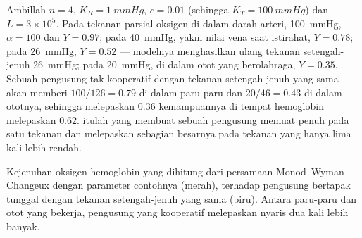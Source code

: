 \begin{example}\label{ex:b3:structural-biology:hb-numbers}
Ambillah $n = 4$, $K_{R} = \qty{1}{mmHg}$, $c = 0.01$ (sehingga $K_{T} =
\qty{100}{mmHg}$) dan $L = 3\times 10^{5}$. Pada tekanan parsial
oksigen di dalam darah arteri, \qty{100}{mmHg}, $\alpha = 100$ dan $Y =
0.97$; pada \qty{40}{mmHg}, yakni nilai vena saat istirahat, $Y = 0.78$; pada
\qty{26}{mmHg}, $Y = 0.52$ --- modelnya menghasilkan ulang tekanan
setengah-jenuh \qty{26}{mmHg}; pada \qty{20}{mmHg}, di dalam otot yang
berolahraga, $Y = 0.35$. Sebuah pengusung tak kooperatif dengan tekanan
setengah-jenuh yang sama akan memberi $100/126 = 0.79$ di dalam paru-paru dan
$20/46 = 0.43$ di dalam ototnya, sehingga melepaskan $0.36$ kemampuannya di
tempat hemoglobin melepaskan $0.62$.  itulah yang membuat sebuah
pengusung memuat penuh pada satu tekanan dan melepaskan sebagian besarnya
pada tekanan yang hanya lima kali lebih rendah.
\end{example}

\begin{omfigure}

{\small Kejenuhan oksigen hemoglobin yang dihitung dari persamaan
Monod--Wyman--Changeux dengan parameter contohnya
(merah), terhadap pengusung bertapak tunggal dengan tekanan setengah-jenuh
yang sama (biru). Antara paru-paru dan otot yang bekerja, pengusung yang
kooperatif melepaskan nyaris dua kali lebih banyak.}
\end{omfigure}

